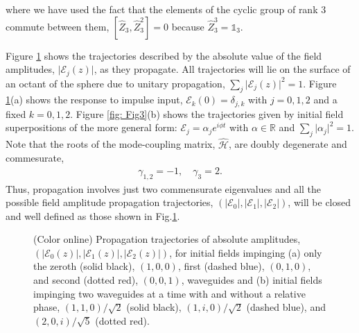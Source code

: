 \documentclass[9pt,twocolumn,twoside]{osajnl}
\begin{document}
where we have used the fact that the elements of the cyclic group of rank $3$ commute between them, $\left[ \hat{Z}_{3} , \hat{Z}_{3}^{2} \right] = 0$ because $\hat{Z}_{3}^{3} = \mathbb{1}_{3}$.  

Figure \ref{fig: Fig4} shows the trajectories described by the absolute value of the field amplitudes, $\vert \mathcal{E}_{j}(z)\vert$, as they propagate. 
All trajectories will lie on the surface of an octant of the sphere due to unitary propagation, $\sum_{j} \vert \mathcal{E}_{j}(z) \vert^2 =1$.
Figure \ref{fig: Fig4}(a) shows the response to impulse input, $ \mathcal{E}_{k}(0)  = \delta_{j,k}$ with $j=0,1,2$ and a fixed $k=0,1,2$. 
Figure \ref{fig: Fig3}(b) shows the trajectories given by initial field superpositions of the more general form: $\mathcal{E}_{j} = \alpha_{j} e^{i \phi t}$ with $\alpha \in \mathbb{R}$ and $\sum_{j} \vert \alpha_{j} \vert^{2} =1$.
Note that the roots of the mode-coupling matrix, $\hat{\mathcal{H}}$, are doubly degenerate and commesurate, 
\begin{eqnarray}
\gamma_{1,2} = -1, \quad \gamma_{3} = 2.
\end{eqnarray}
Thus, propagation involves just two commensurate eigenvalues and all the possible field amplitude propagation trajectories, $\left( \vert \mathcal{E}_{0} \vert, \vert \mathcal{E}_{1} \vert, \vert \mathcal{E}_{2} \vert  \right)$, will be closed and well defined as those shown in Fig.\ref{fig: Fig4}.


\begin{figure}[htbp]
\centering
{}
\caption{(Color online) Propagation trajectories of absolute amplitudes, $(\vert \mathcal{E}_{0}(z) \vert, \vert \mathcal{E}_{1}(z) \vert, \vert \mathcal{E}_{2}(z) \vert )$, for initial fields impinging (a) only the zeroth (solid black), $(1,0,0)$, first (dashed blue), $(0,1,0)$, and second (dotted red), $(0,0,1)$, waveguides and (b) initial fields impinging two waveguides at a time with and without a relative phase, $(1,1,0)/ \sqrt{2}$ (solid black), $(1,i,0)/\sqrt{2}$ (dashed blue), and $(2,0,i)/\sqrt{5}$ (dotted red).}
\label{fig: Fig4}
\end{figure}
\end{document}
